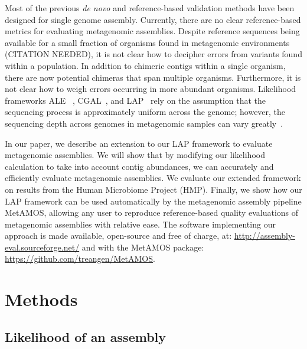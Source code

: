 \documentclass[conference]{IEEEtran}
\begin{document}
Most of the previous \emph{de novo} and reference-based validation methods have been designed for single genome assembly.
Currently, there are no clear reference-based metrics for evaluating metagenomic assemblies.
Despite reference sequences being available for a small fraction of organisms found in metagenomic environments (CITATION NEEDED), it is not clear how to decipher errors from variants found within a population.
In addition to chimeric contigs within a single organism, there are now potential chimeras that span multiple organisms.
Furthermore, it is not clear how to weigh errors occurring in more abundant organisms.
Likelihood frameworks ALE ~\cite{clark2013ale}, CGAL~\cite{rahman2013cgal}, and LAP~\cite{LAP} rely on the assumption that the sequencing process is approximately uniform across the genome; however, the sequencing depth across genomes in metagenomic samples can vary greatly~\cite{carrigg2007dna,krsek1999comparison,morgan2010metagenomic,temperton2009bias,darling2004mauve}.


In our paper, we describe an extension to our LAP framework to evaluate metagenomic assemblies.
We will show that by modifying our likelihood calculation to take into account contig abundances, we can accurately and efficiently evaluate metagenomic assemblies.
We evaluate our extended framework on results from the Human Microbiome Project (HMP).
Finally, we show how our LAP framework can be used automatically by the metagenomic assembly pipeline MetAMOS\cite{treangen2013metamos}, allowing any user to reproduce reference-based quality evaluations of metagenomic assemblies with relative ease.
The software implementing our approach is made available, open-source and free of charge, at: \url{http://assembly-eval.sourceforge.net/} and with the MetAMOS package: \url{https://github.com/treangen/MetAMOS}.

 

\section{Methods}
\subsection{Likelihood of an assembly}
\end{document}
